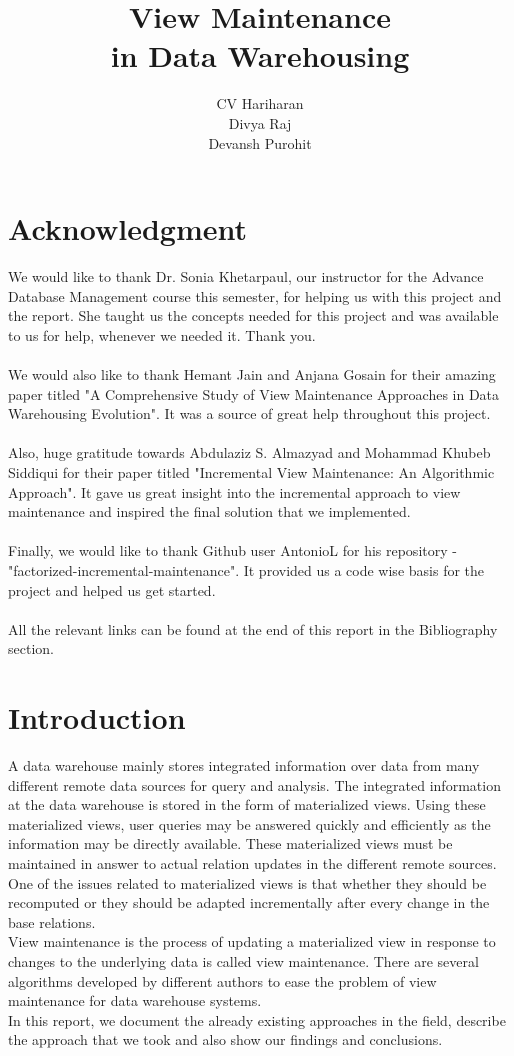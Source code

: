 \documentclass[12pt]{report}
\title{\textbf{\Huge View Maintenance \\ in Data Warehousing } }
\author{CV Hariharan \bullet 1610110147 \\ Divya Raj \bullet 1610110123 \\ Devansh Purohit \bullet 1610110116}
\date{}
\begin{document}
\maketitle
\section*{Acknowledgment}
We would like to thank Dr. Sonia Khetarpaul, our instructor for the Advance Database Management course this semester, for helping us with this project and the report. She taught us the concepts needed for this project and was available to us for help, whenever we needed it. Thank you.\\
\\We would also like to thank Hemant Jain and Anjana Gosain for their amazing paper titled "A Comprehensive Study of View Maintenance Approaches in 
Data Warehousing Evolution". It was a source of great help throughout this project. \\
\\Also, huge gratitude towards Abdulaziz S. Almazyad and Mohammad Khubeb Siddiqui for their paper titled "Incremental View Maintenance: An Algorithmic 
Approach". It gave us great insight into the incremental approach to view maintenance and inspired the final solution that we implemented.
\\\\Finally, we would like to thank Github user AntonioL for his repository -  "factorized-incremental-maintenance". It provided us a code wise basis for the project and helped us get started.
\\\\All the relevant links can be found at the end of this report in the Bibliography section.
\tableofcontents
\newpage
\renewcommand{\thesection}{\arabic{section}}
\section{Introduction}
A data warehouse mainly stores integrated information over data from 
many different remote data sources for query and analysis. The 
integrated information at the data warehouse is stored in the form of 
materialized views. Using these materialized views, user queries may be 
answered quickly and efficiently as the information may be directly 
available. These materialized views must be maintained in answer to 
actual relation updates in the different remote sources. \\
One of the issues 
related to materialized views is that whether they should be recomputed 
or they should be adapted incrementally after every change in the base 
relations. \\
View maintenance is the process of updating a materialized 
view in response to changes to the underlying data is called view 
maintenance. There are several algorithms developed by different 
authors to ease the problem of view maintenance for data warehouse 
systems. \\
In this report, we document the already existing approaches in the field, describe the approach that we took and also show our findings and conclusions.
\end{document}
